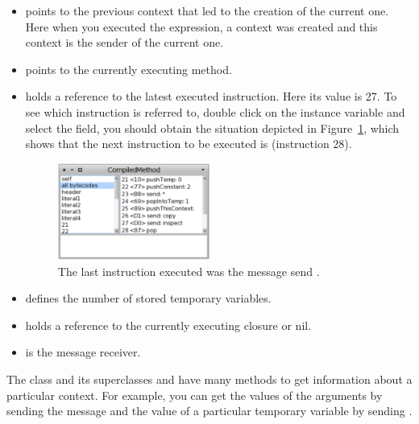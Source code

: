 \documentclass[a4paper,10pt,twoside]{book}
\begin{document}
\begin{itemize}
\item {} points to the previous context that led to the creation of the current one. Here when you executed the expression, a context was created and this context is the sender of the current one.

\item {} points to the currently executing method.

\item {} holds a reference to the latest executed instruction. Here its value is 27. To see which instruction is referred to, double click on the  instance variable and select the  field, you should obtain the situation depicted in Figure~\ref{ByteCodes}, which shows that the next instruction to be executed is  (instruction 28).

\begin{figure}
  \begin{center}\includegraphics[width=5cm]{ByteCodes}
    \caption{The last instruction executed was the message send .\label{ByteCodes}}
  \end{center}
\end{figure}

\item {} defines the number of stored temporary variables.

\item {} holds a reference to the currently executing closure or nil.

\item {} is the message receiver.
\end{itemize}

The class  and its superclasses  and  have many methods to get information about a particular context. For example, you can get the values of the arguments by sending the  message and the value of a particular temporary variable by sending .

\end{document}

